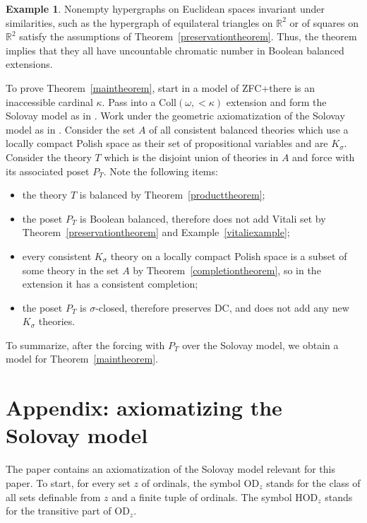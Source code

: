 \documentclass{article}
\newcommand{\gw}{\omega}
\newcommand{\gs}{\sigma}
\newcommand{\hvd}{\mathrm{HOD}}
\newcommand{\vd}{\mathrm{OD}}
\newcommand{\coll}{\mathrm{Coll}}
\theoremstyle{definition}
\newtheorem{example}[theorem]{Example}
\begin{document}
\begin{example}
	Nonempty hypergraphs on Euclidean spaces invariant under similarities, such as the hypergraph of equilateral triangles on $\mathbb{R}^2$ or of squares on $\mathbb{R}^2$ satisfy the assumptions of Theorem~\ref{preservationtheorem}. Thus, the theorem implies that they all have uncountable chromatic number in Boolean balanced extensions.
\end{example}

\noindent To prove Theorem~\ref{maintheorem}, start in a model of ZFC+there is an inaccessible cardinal $\kappa$. Pass into a $\coll(\gw, <\kappa)$ extension and form the Solovay model as in \cite{solovay:model}. Work under the geometric axiomatization of the Solovay model as in \cite{z:reloadedA}. Consider the set $A$ of all consistent balanced theories which use a locally compact Polish space as their set of propositional variables and are $K_\gs$. Consider the theory $T$ which is the disjoint union of theories in $A$ and force with its associated poset $P_T$. Note the following items:

\begin{itemize}
\item the theory $T$ is balanced by Theorem~\ref{producttheorem};
\item the poset $P_T$ is Boolean balanced, therefore does not add Vitali set by Theorem~\ref{preservationtheorem} and Example~\ref{vitaliexample};
\item every consistent $K_\gs$ theory on a locally compact Polish space is a subset of some theory in the set $A$ by Theorem~\ref{completiontheorem}, so in the extension it has a consistent completion;
\item the poset $P_T$ is $\gs$-closed, therefore preserves DC, and does not add any new $K_\gs$ theories.
\end{itemize}

\noindent To summarize, after the forcing with $P_T$ over the Solovay model, we obtain a model for Theorem~\ref{maintheorem}.

\section{Appendix: axiomatizing the Solovay model}
	\label{appendixsection}
	
The paper \cite{z:reloadedA} contains an axiomatization of the Solovay model relevant for this paper. To start, for every set $z$ of ordinals, the symbol $\vd_z$ stands for the class of all sets definable from $z$ and a finite tuple of ordinals. The symbol $\hvd_z$ stands for the transitive part of $\vd_z$.
	
\end{document}
